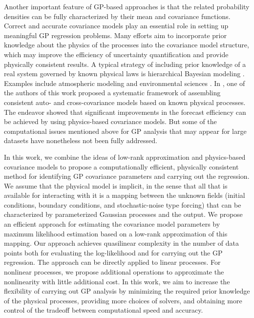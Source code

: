 \documentclass[article,ij4uq]{ij4uq}              %
\begin{document}
\par Another important feature of GP-based approaches is that the related probability densities can be fully characterized by their mean and covariance functions. Correct and accurate covariance models play an essential role in setting up meaningful GP regression problems. Many efforts aim to incorporate prior knowledge about the physics of the processes into the covariance model structure, which may improve the efficiency of uncertainty quantification and provide physically consistent results. A typical strategy of including prior knowledge of a real system governed by known physical laws is hierarchical Bayesian modeling \cite{GelmanBayesian,BerlinerHierarchical}. Examples include atmospheric modeling \cite{Atmo1,Atmo2,Atmo3,Atmo4} and environmental sciences \cite{Atmo2,Es1,Es2,Es3,Es4}. In \cite{CovModel}, one of the authors of this work proposed a systematic framework of assembling consistent auto- and cross-covariance models based on known physical processes. The endeavor showed that significant improvements in the forecast efficiency can be achieved by using physics-based covariance models. But some of the computational issues mentioned above for GP analysis that may appear for large datasets have nonetheless not been fully addressed.

\par In this work, we combine the ideas of low-rank approximation and physics-based covariance models to propose a computationally efficient, physically consistent method for identifying GP covariance parameters and carrying out the regression. We assume that the physical model is implicit, in the sense that all that is available for interacting with it is a mapping between the unknown fields (initial conditions, boundary conditions, and stochastic-noise type forcing) that can be characterized by parameterized Gaussian processes and the output. We propose an efficient approach for estimating the covariance model parameters by maximum likelihood estimation based on a low-rank approximation of this mapping. Our approach achieves quasilinear complexity in the number of data points  both for  evaluating the log-likelihood and for carrying out the GP regression. The approach can be directly applied to linear processes. For nonlinear processes, we propose additional operations to approximate the nonlinearity with little additional cost. In this work, we aim to increase the flexibility of carrying out GP analysis by minimizing the required prior knowledge of the physical processes, providing more choices of solvers, and obtaining more control of the tradeoff between computational speed and accuracy. 
\end{document}
